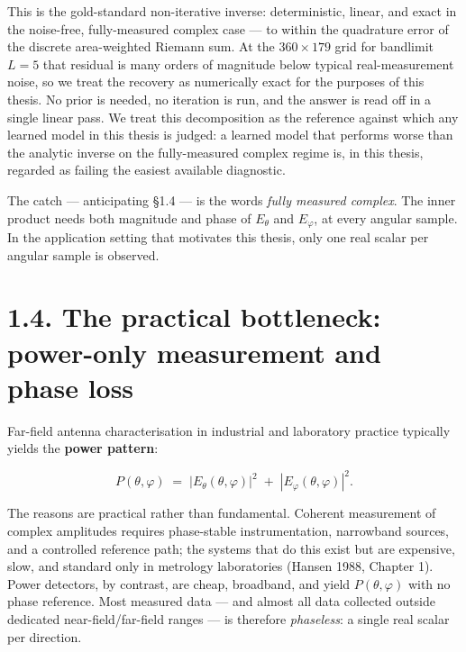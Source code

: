 \documentclass[
  english,
  11pt,
]{report}
\begin{document}
This is the gold-standard non-iterative inverse: deterministic, linear,
and exact in the noise-free, fully-measured complex case --- to within
the quadrature error of the discrete area-weighted Riemann sum. At the
\(360 \times 179\) grid for bandlimit \(L=5\) that residual is many
orders of magnitude below typical real-measurement noise, so we treat
the recovery as numerically exact for the purposes of this thesis. No
prior is needed, no iteration is run, and the answer is read off in a
single linear pass. We treat this decomposition as the reference against
which any learned model in this thesis is judged: a learned model that
performs worse than the analytic inverse on the fully-measured complex
regime is, in this thesis, regarded as failing the easiest available
diagnostic.

The catch --- anticipating §1.4 --- is the words \emph{fully measured
complex}. The inner product needs both magnitude and phase of
\(E_\theta\) and \(E_\varphi\), at every angular sample. In the
application setting that motivates this thesis, only one real scalar per
angular sample is observed.

\section{1.4. The practical bottleneck: power-only measurement and phase
loss}\label{the-practical-bottleneck-power-only-measurement-and-phase-loss}

Far-field antenna characterisation in industrial and laboratory practice
typically yields the \textbf{power pattern}:

\[
P(\theta,\varphi) \;=\; |E_\theta(\theta,\varphi)|^2 \;+\; |E_\varphi(\theta,\varphi)|^2.
\]

The reasons are practical rather than fundamental. Coherent measurement
of complex amplitudes requires phase-stable instrumentation, narrowband
sources, and a controlled reference path; the systems that do this exist
but are expensive, slow, and standard only in metrology laboratories
(Hansen 1988, Chapter 1). Power detectors, by contrast, are cheap,
broadband, and yield \(P(\theta,\varphi)\) with no phase reference. Most
measured data --- and almost all data collected outside dedicated
near-field/far-field ranges --- is therefore \emph{phaseless}: a single
real scalar per direction.
\end{document}

